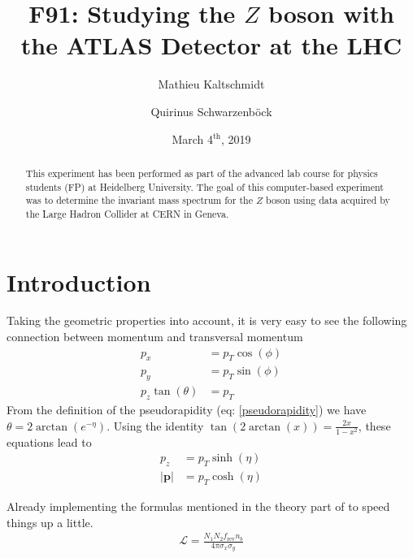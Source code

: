 \documentclass[twocolumn,
			   showpacs,%
               nofootinbib,
               aps,%
               prd,
               notitlepage,
               showkeys,
               10pt]{revtex4-1}
\begin{document}
\title{F91: Studying the $Z$ boson with the ATLAS Detector at the LHC }
\author{Mathieu Kaltschmidt}
\author{Quirinus Schwarzenb\"ock}

\date[Carried out in the week of  ]{March 4$^{\text{th}}$, 2019}


\begin{abstract}
This experiment has been performed as part of the advanced lab course for physics students (FP) at Heidelberg University.
The goal of this computer-based experiment was to determine the invariant mass spectrum for the $Z$ boson using data acquired by the Large Hadron Collider at CERN in Geneva.
\end{abstract}

\maketitle



\section{Introduction}
Taking the geometric properties into account, it is very easy to see the following connection between momentum and transversal momentum
\begin{align}
	p_x &= p_T \cos(\phi)\\
	p_y &= p_T \sin(\phi)\\
	p_z \tan(\theta) &= p_T
\end{align}
From the definition of the pseudorapidity (eq: \ref{pseudorapidity}) we have $\theta = 2\arctan(e^{-\eta})$. Using the identity $\tan(2\arctan(x)) = \frac{2x}{1 - x^2}$, these equations lead to 
\begin{align}
	p_z &= p_T\sinh(\eta)\\
	\left|\mathbf{p}\right| &= p_T \cosh(\eta)
\end{align}



Already implementing the formulas mentioned in the theory part of \cite{F91manual} to speed things up a little.
\begin{align}
\mathcal{L} = \frac{N_1N_2f_{\text{rev}}n_b}{4\pi\sigma_x\sigma_y}
\end{align}
\end{document}
